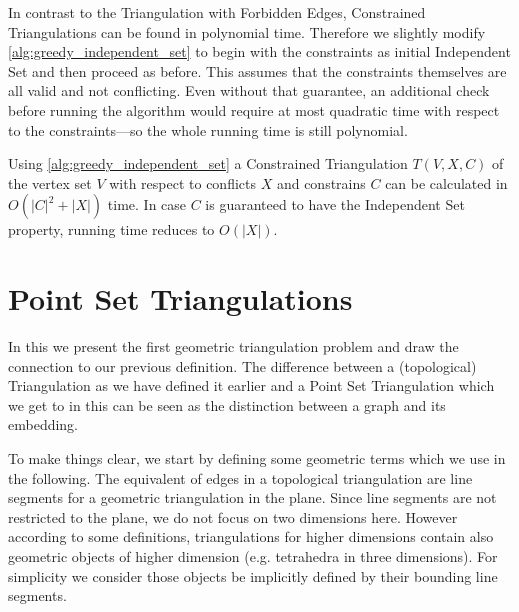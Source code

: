 In contrast to the Triangulation with Forbidden Edges, Constrained
Triangulations can be found in polynomial time. Therefore we slightly
modify \cref{alg:greedy_independent_set} to begin with the constraints
as initial Independent Set and then proceed as before. This assumes
that the constraints themselves are all valid and not conflicting.
Even without that guarantee, an additional check before running the
algorithm would require at most quadratic time with respect to the
constraints---so the whole running time is still polynomial.

\begin{theorem}
  Using \cref{alg:greedy_independent_set}
  a Constrained Triangulation \(T(V,X,C)\) of the vertex set \(V\)
  with respect to conflicts \(X\) and constrains \(C\)
  can be calculated in \(O(|C|^2 + |X|)\) time.
  In case \(C\) is guaranteed to have the Independent Set property,
  running time reduces to \(O(|X|)\).
\end{theorem}

\section{Point Set Triangulations}
\label{sec:point_set_triangulations}
In this  we present the first
geometric triangulation problem and draw the connection to our
previous definition. The difference between a (topological)
Triangulation as we have defined it earlier and a Point Set
Triangulation which we get to in this
 can be seen as the distinction
between a graph and its embedding.

To make things clear, we start by defining some geometric terms which
we use in the following. The equivalent of edges in a topological
triangulation are line segments for a geometric triangulation in the
plane. Since line segments are not restricted to the plane, we do not
focus on two dimensions here. However according to some definitions,
triangulations for higher dimensions contain also geometric objects
of higher dimension (e.g. tetrahedra in three dimensions). For
simplicity we consider those objects be implicitly defined by their
bounding line segments.


